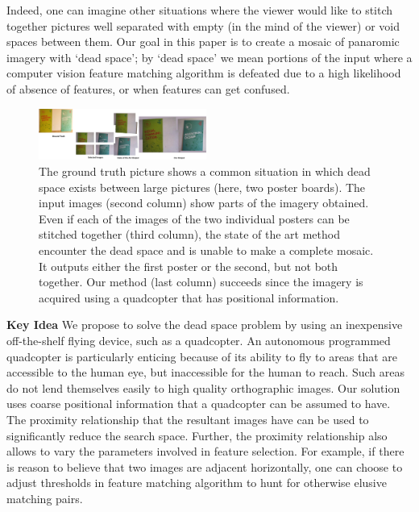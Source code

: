 \documentclass[10pt,twocolumn,letterpaper]{article}
\begin{document}
Indeed, one can imagine other situations where the viewer would like
to stitch together pictures well separated with empty (in the mind of
the viewer) or void spaces between them.  Our goal in this paper is to
create a mosaic of panaromic imagery with `dead space';
by `dead space' we mean portions of the input where a computer vision
feature matching algorithm is defeated due to a high likelihood of
absence of features, or when features can get confused.

\begin{figure}[t!]
  \centering
  \includegraphics[width=0.49\textwidth]{figures/teaser2}
  \caption{ \label{fig:teaser} The ground truth picture shows a common
    situation in which dead space exists between large pictures (here,
    two poster boards). The input images (second column) show parts of
    the imagery obtained. Even if each of the images of the two
    individual posters can be stitched together (third column), the
    state of the art method encounter the dead space and is unable to
    make a complete mosaic.  It outputs either the first poster or the
    second, but not both together.  Our method (last column) succeeds
    since the imagery is acquired using a quadcopter that has
    positional information.}
\end{figure}

{\bf Key Idea} We propose to solve the dead space problem by using an
inexpensive off-the-shelf flying device, such as a quadcopter.  An
autonomous programmed quadcopter is particularly enticing because of
its ability to fly to areas that are accessible to the human eye, but
inaccessible for the human to reach.  Such areas do not lend
themselves easily to high quality orthographic images. Our solution
uses coarse positional information that a quadcopter can be assumed to
have.  The proximity relationship that the resultant images have can
be used to significantly reduce the search space.  Further, the
proximity relationship also allows to vary the parameters involved in
feature selection. For example, if there is reason to believe that two
images are adjacent horizontally, one can choose to adjust
thresholds in feature matching algorithm to hunt for otherwise elusive
matching pairs. 
\end{document}
